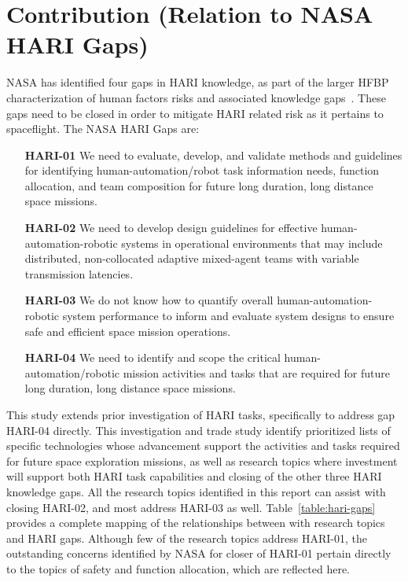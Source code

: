 \section{Contribution (Relation to NASA HARI Gaps)}
NASA has identified four gaps in HARI knowledge, as part of the larger HFBP characterization of human factors risks and associated knowledge gaps~\citep{hari_risk}.
These gaps need to be closed in order to mitigate HARI related risk as it pertains to spaceflight.
The NASA HARI Gaps are:
\begin{itemize}
    \item[\textbf{HARI-01}] We need to evaluate, develop, and validate methods and guidelines for identifying human-automation/robot task information needs, function allocation, and team composition for future long duration, long distance space missions.
    \item[\textbf{HARI-02}] We need to develop design guidelines for effective human-automation-robotic systems in operational environments that may include distributed, non-collocated adaptive mixed-agent teams with variable transmission latencies.
    \item[\textbf{HARI-03}] We do not know how to quantify overall human-automation-robotic system performance to inform and evaluate system designs to ensure safe and efficient space mission operations.
    \item[\textbf{HARI-04}] We need to identify and scope the critical human-automation/robotic mission activities and tasks that are required for future long duration, long distance space missions.
\end{itemize}

This study extends prior investigation of HARI tasks, specifically to address gap HARI-04 directly.
This investigation and trade study identify prioritized lists of specific technologies whose advancement support the activities and tasks required for future space exploration missions, as well as research topics where investment will support both HARI task capabilities and closing of the other three HARI knowledge gaps.
All the research topics identified in this report can assist with closing HARI-02, and most address HARI-03 as well.
Table~\ref{table:hari-gaps} provides a complete mapping of the relationships between with research topics and HARI gaps.
Although few of the research topics address HARI-01, the outstanding concerns identified by NASA for closer of HARI-01 pertain directly to the topics of safety and function allocation, which are reflected here.

